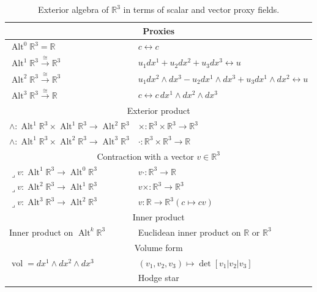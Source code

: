 \begin{table}[htbp]\centering\footnotesize
\caption{{Exterior algebra of $\mathbb R^3$ in terms of scalar and vector proxy fields.}}\label{tab:exterior-algebra-r3}
\setlength{\tabcolsep}{4pt}
\begin{tabular}{l|l}\hline
\multicolumn{2}{c}{{Proxies}}\\\hline
$\operatorname{Alt}^0\mathbb R^3=\mathbb R$&$c\leftrightarrow c$\\
$\operatorname{Alt}^1\mathbb R^3\xrightarrow{\cong}\mathbb R^3$&$u_1dx^1+u_2dx^2+u_3dx^3\leftrightarrow u$\\
$\operatorname{Alt}^2\mathbb R^3\xrightarrow{\cong}\mathbb R^3$&$u_1dx^2\wedge dx^3-u_2dx^1\wedge dx^3+u_3dx^1\wedge dx^2\leftrightarrow u$\\
$\operatorname{Alt}^3\mathbb R^3\xrightarrow{\cong}\mathbb R$&$c\leftrightarrow c\,dx^1\wedge dx^2\wedge dx^3$\\\hline
\multicolumn{2}{c}{{Exterior product}}\\\hline
$\wedge:\operatorname{Alt}^1\mathbb R^3\times\operatorname{Alt}^1\mathbb R^3\to\operatorname{Alt}^2\mathbb R^3$&$\times:\mathbb R^3\times\mathbb R^3\to\mathbb R^3$\\
$\wedge:\operatorname{Alt}^1\mathbb R^3\times\operatorname{Alt}^2\mathbb R^3\to\operatorname{Alt}^3\mathbb R^3$&$\cdot:\mathbb R^3\times\mathbb R^3\to\mathbb R$\\\hline
\multicolumn{2}{c}{{Contraction with a vector $v\in\mathbb R^3$}}\\\hline
$\lrcorner v:\operatorname{Alt}^1\mathbb R^3\to\operatorname{Alt}^0\mathbb R^3$&$v\cdot:\mathbb R^3\to\mathbb R$\\
$\lrcorner v:\operatorname{Alt}^2\mathbb R^3\to\operatorname{Alt}^1\mathbb R^3$&$v\times:\mathbb R^3\to\mathbb R^3$\\
$\lrcorner v:\operatorname{Alt}^3\mathbb R^3\to\operatorname{Alt}^2\mathbb R^3$&$v:\mathbb R\to\mathbb R^3$\quad$(c\mapsto cv)$\\\hline
\multicolumn{2}{c}{{Inner product}}\\\hline
{Inner product on $\operatorname{Alt}^k\mathbb R^3$}&{Euclidean inner product on $\mathbb R$ or $\mathbb R^3$}\\\hline
\multicolumn{2}{c}{{Volume form}}\\\hline
$\operatorname{vol}=dx^1\wedge dx^2\wedge dx^3$&$(v_1,v_2,v_3)\mapsto\det[v_1|v_2|v_3]$\\\hline
\multicolumn{2}{c}{Hodge {star}}\\\hline

\end{tabular}
\end{table}
